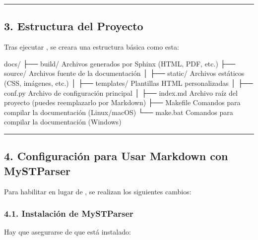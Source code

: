 \documentclass[a4paper,10pt,oneside,spanish,openany]{sphinxmanual}
\begin{document}
\bigskip\hrule\bigskip



\subsection{3. Estructura del Proyecto}
\label{\detokenize{configuracion_inicial/003.Creacion_proyecto_Sphinx:estructura-del-proyecto}}
\sphinxAtStartPar
Tras ejecutar , se creara una estructura básica como esta:

\begin{sphinxVerbatim}[commandchars=\\\{\}]
docs/
├── build/                  \PYGZsh{} Archivos generados por Sphinx (HTML, PDF, etc.)
├── source/                 \PYGZsh{} Archivos fuente de la documentación
│   ├── \PYGZus{}static/            \PYGZsh{} Archivos estáticos (CSS, imágenes, etc.)
│   ├── \PYGZus{}templates/         \PYGZsh{} Plantillas HTML personalizadas
│   ├── conf.py             \PYGZsh{} Archivo de configuración principal
│   ├── index.md           \PYGZsh{} Archivo raíz del proyecto (puedes reemplazarlo por Markdown)
├── Makefile                \PYGZsh{} Comandos para compilar la documentación (Linux/macOS)
└── make.bat                \PYGZsh{} Comandos para compilar la documentación (Windows)
\end{sphinxVerbatim}


\bigskip\hrule\bigskip



\subsection{4. Configuración para Usar Markdown con MyST\sphinxhyphen{}Parser}
\label{\detokenize{configuracion_inicial/003.Creacion_proyecto_Sphinx:configuracion-para-usar-markdown-con-myst-parser}}
\sphinxAtStartPar
Para habilitar  en lugar de , se realizan los siguientes cambios:


\subsubsection{4.1. Instalación de MyST\sphinxhyphen{}Parser}
\label{\detokenize{configuracion_inicial/003.Creacion_proyecto_Sphinx:instalacion-de-myst-parser}}
\sphinxAtStartPar
Hay que asegurarse de que  está instalado:
\end{document}
